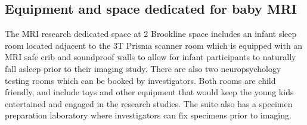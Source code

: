 \documentclass[11pt]{amsart}
\begin{document}
\hypertarget{x-equipment-and-space-dedicated-for-baby-mri}{\subsection*{Equipment and space dedicated for baby MRI}}
The MRI research dedicated space at 2 Brookline space includes an infant sleep room located adjacent to the 3T Prisma scanner room which is equipped with an MRI safe crib and soundproof walls to allow for infant participants to naturally fall asleep prior to their imaging study. There are also two neuropsychology testing rooms which can be booked by investigators. Both rooms are child friendly, and include toys and other equipment that would keep the young kids entertained and engaged in the research studies. The suite also has a specimen preparation laboratory where investigators can fix specimens prior to imaging.
\end{document}
